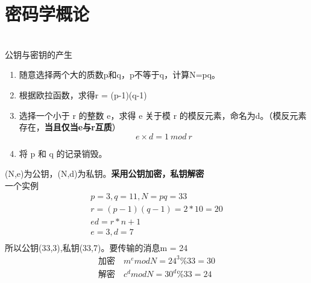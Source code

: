 \chapter{密码学概论}

\\
公钥与密钥的产生
\begin{enumerate}
	\item 随意选择两个大的质数p和q，p不等于q，计算N=pq。
	\item 根据欧拉函数，求得r = (p-1)(q-1)
	\item 选择一个小于 r 的整数 e，求得 e 关于模 r 的模反元素，命名为d。（模反元素存在，\textbf{当且仅当e与r互质}）
	\begin{equation}\label{key}
	e\times d = 1\ mod\ r
	\end{equation}
	\item 将 p 和 q 的记录销毁。
\end{enumerate}
(N,e)为公钥，(N,d)为私钥。\textbf{采用公钥加密，私钥解密}\\
一个实例
\begin{gather}
 p = 3,q=11 , N = pq = 33\\
 r = (p-1)(q-1) = 2*10 = 20 \\
 ed = r * n + 1\\
 e = 3,d = 7\\
\end{gather}
所以公钥(33,3),私钥(33,7)。要传输的消息m = 24
\begin{gather}
 \text{加密}\quad m^e mod N = 24^3 \% 33 = 30\\
 \text{解密}\quad c^d mod N = 30 ^d \% 33 =24
\end{gather}
